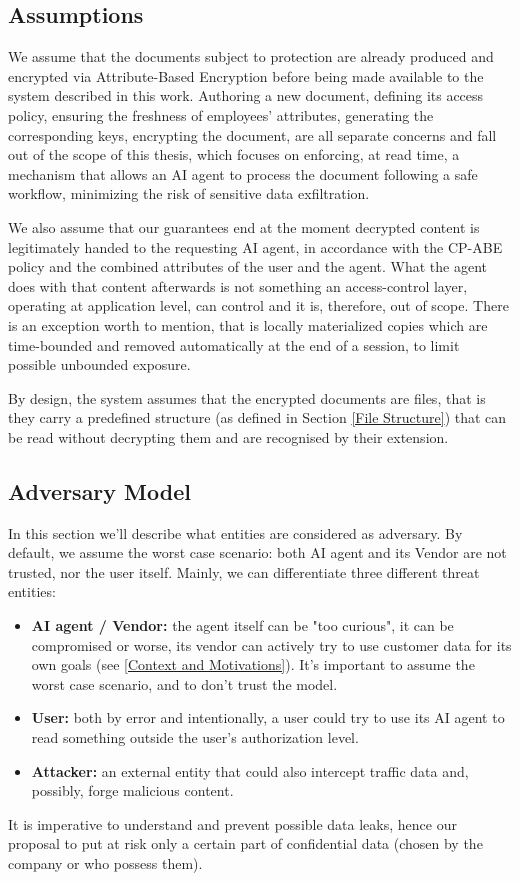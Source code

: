 \subsection{Assumptions}\label{Assumptions}
We assume that the documents subject to protection are already produced and encrypted via Attribute-Based Encryption before being made available to the system described in this work. Authoring a new document, defining its access policy, ensuring the freshness of employees' attributes, generating the corresponding keys, encrypting the document, are all separate concerns and fall out of the scope of this thesis, which focuses on enforcing, at read time, a mechanism that allows an AI agent to process the document following a safe workflow, minimizing the risk of sensitive data exfiltration.

We also assume that our guarantees end at the moment decrypted content is legitimately handed to the requesting AI agent, in accordance with the CP-ABE policy and the combined attributes of the user and the agent.
What the agent does with that content afterwards is not something an access-control layer, operating at application level, can control and it is, therefore, out of scope. There is an exception worth to mention, that is locally materialized copies which are time-bounded and removed automatically at the end of a session, to limit possible unbounded exposure.

By design, the system assumes that the encrypted documents are  files, that is they carry a predefined structure (as defined in Section \ref{File Structure}) that can be read without decrypting them and are recognised by their extension.

\subsection{Adversary Model}
In this section we'll describe what entities are considered as adversary.
By default, we assume the worst case scenario: both AI agent and its Vendor are not trusted, nor the user itself.
Mainly, we can differentiate three different threat entities:
\begin{itemize}
    \item \textbf{AI agent / Vendor:} the agent itself can be "too curious", it can be compromised or worse, its vendor can actively try to use customer data for its own goals (see \ref{Context and Motivations}). It's important to assume the worst case scenario, and to don't trust the model.
    \item \textbf{User:} both by error and intentionally, a user could try to use its AI agent to read something outside the user's authorization level.
    \item \textbf{Attacker:} an external entity that could also intercept traffic data and, possibly, forge malicious content.
\end{itemize}
It is imperative to understand and prevent possible data leaks, hence our proposal to put at risk only a certain part of confidential data (chosen by the company or who possess them).

